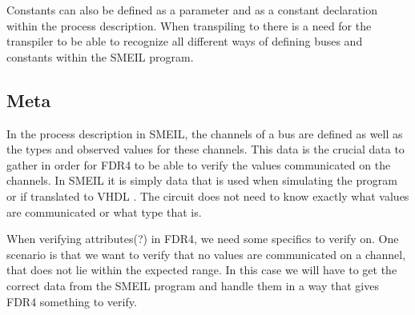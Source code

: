 Constants can also be defined as a parameter and as a constant declaration within the process description. %
When transpiling to \cspm there is a need for the transpiler to be able to recognize all different ways of defining buses and constants within the SMEIL program.

\subsection{Meta}

In the process description in SMEIL, the channels of a bus are defined as well as the types and observed values for these channels. This data is the crucial data to gather in order for FDR4 to be able to verify the values communicated on the channels. In SMEIL it is simply data that is used when simulating the program or if translated to VHDL
. The circuit does not need to know exactly what values are communicated or what type that is.


When verifying attributes(?) in FDR4, we need some specifics to verify on. One scenario is that we want to verify that no values are communicated on a channel, that does not lie within the expected range. In this case we will have to get the correct data from the SMEIL program and handle them in a way that gives FDR4 something to verify.
